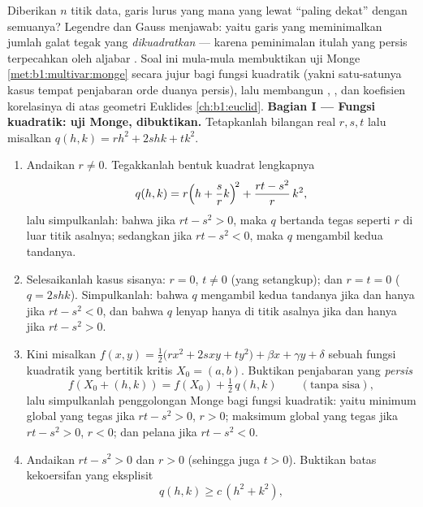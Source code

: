 \begin{problem}\label{pb:b1:multivar:1}
Diberikan $n$ titik data, garis lurus yang mana yang lewat ``paling dekat''
dengan semuanya? Legendre dan Gauss menjawab: yaitu garis yang meminimalkan
jumlah galat tegak yang \emph{dikuadratkan} --- karena peminimalan
itulah yang persis terpecahkan oleh aljabar . Soal ini
mula-mula membuktikan uji Monge \cref{met:b1:multivar:monge}
secara jujur bagi fungsi kuadratik (yakni satu-satunya kasus tempat
penjabaran orde duanya persis), lalu membangun , , dan koefisien korelasinya
di atas geometri Euklides
\cref{ch:b1:euclid}.
\medskip
\noindent\textbf{Bagian I --- Fungsi kuadratik: uji Monge,
dibuktikan.} Tetapkanlah bilangan real $r, s, t$ lalu misalkan $q(h, k) = r h^2 + 2s hk +
t k^2$.
\begin{enumerate}
  \item Andaikan $r \neq 0$. Tegakkanlah bentuk kuadrat lengkapnya
        \[
        q(h, k) = r\Bigl(h + \frac{s}{r}k\Bigr)^{\!2}
        + \frac{rt - s^2}{r}\,k^2 ,
        \]
        lalu simpulkanlah: bahwa jika $rt - s^2 > 0$, maka $q$ bertanda tegas
        seperti $r$ di luar titik asalnya; sedangkan jika $rt - s^2 < 0$, maka $q$ mengambil kedua
        tandanya.
  \item Selesaikanlah kasus sisanya: $r = 0$, $t \neq 0$
        (yang setangkup); dan $r = t = 0$ ($q = 2shk$). Simpulkanlah:
        bahwa $q$ mengambil kedua tandanya jika dan hanya jika $rt - s^2 < 0$, dan bahwa $q$
        lenyap hanya di titik asalnya jika dan hanya jika $rt - s^2 > 0$.
  \item Kini misalkan $f(x, y) = \frac12\bigl(r x^2 + 2s xy + t
        y^2\bigr) + \beta x + \gamma y + \delta$ sebuah fungsi
        kuadratik yang bertitik kritis $X_0 = (a, b)$. Buktikan
        penjabaran yang \emph{persis}
        \[
        f(X_0 + (h,k)) = f(X_0) + \tfrac12\,q(h, k)
        \qquad (\text{tanpa sisa}),
        \]
        lalu simpulkanlah penggolongan Monge bagi fungsi
        kuadratik: yaitu minimum global yang tegas jika $rt - s^2 > 0$, $r >
        0$; maksimum global yang tegas jika $rt - s^2 > 0$, $r < 0$;
        dan pelana jika $rt - s^2 < 0$.
  \item Andaikan $rt - s^2 > 0$ dan $r > 0$ (sehingga juga $t > 0$).
        Buktikan batas keko\-ersifan yang eksplisit
        \[
        q(h, k) \geq c\,(h^2 + k^2),
\]
\end{enumerate}
\end{problem}
